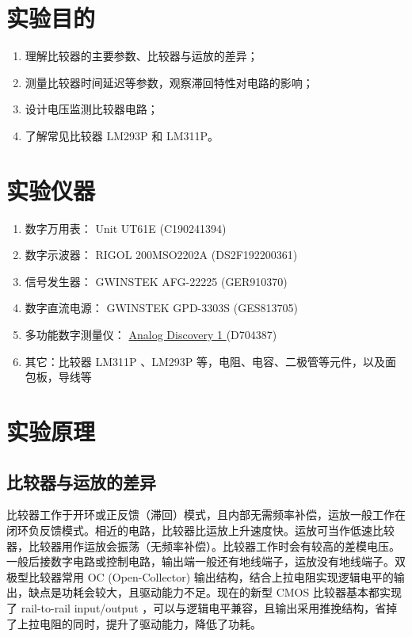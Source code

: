 \documentclass[UTF8]{article}
\begin{document}
\section{实验目的}
\begin{enumerate}
\item 理解比较器的主要参数、比较器与运放的差异；
\item 测量比较器时间延迟等参数，观察滞回特性对电路的影响；
\item 设计电压监测比较器电路；
\item 了解常见比较器 LM293P 和 LM311P。
\end{enumerate}


\section{实验仪器}

\begin{enumerate}
    \item 数字万用表： Unit UT61E (C190241394)
    \item 数字示波器： RIGOL 200MSO2202A (DS2F192200361)
    \item 信号发生器： GWINSTEK AFG-22225 (GER910370)
    \item 数字直流电源： GWINSTEK GPD-3303S (GES813705) 
    \item 多功能数字测量仪： 
    \href{https://digilent.com/reference/test-and-measurement/analog-discovery/start
    }{ %
    Analog Discovery 1
    } 
    (D704387)
    \item 其它：比较器 LM311P 、LM293P 等，电阻、电容、二极管等元件，以及面包板，导线等
\end{enumerate}

\section{实验原理}

\subsection{比较器与运放的差异}

比较器工作于开环或正反馈（滞回）模式，且内部无需频率补偿，运放一般工作在闭环负反馈模式。相近的电路，比较器比运放上升速度快。运放可当作低速比较器，比较器用作运放会振荡（无频率补偿）。比较器工作时会有较高的差模电压。一般后接数字电路或控制电路，输出端一般还有地线端子，运放没有地线端子。双极型比较器常用 OC (Open-Collector) 输出结构，结合上拉电阻实现逻辑电平的输出，缺点是功耗会较大，且驱动能力不足。现在的新型 CMOS 比较器基本都实现了 rail-to-rail input/output ，可以与逻辑电平兼容，且输出采用推挽结构，省掉了上拉电阻的同时，提升了驱动能力，降低了功耗。
\end{document}
